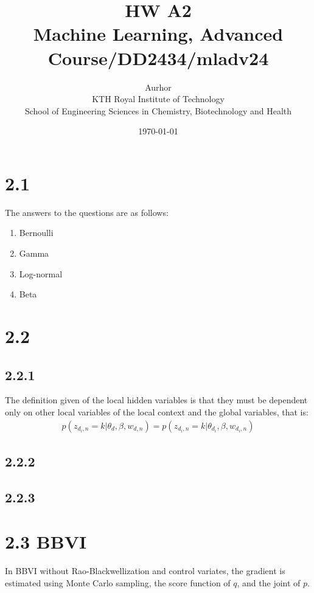 \documentclass{article}
\title{HW A2\\\Large{Machine Learning, Advanced Course/DD2434/mladv24}}
\author{Aurhor \\ KTH Royal Institute of Technology\\ School of Engineering Sciences in Chemistry, Biotechnology and Health}
\date{\today}
\begin{document}
\maketitle

\fancyfoot[C]{\thepage}
\begin{multicols}{2}

    \section*{2.1}
    The answers to the questions are as follows:
    \begin{enumerate}[noitemsep, topsep=0pt]
        \item Bernoulli
        \item Gamma
        \item Log-normal
        \item Beta
    \end{enumerate}
    \section*{2.2}
    \subsection*{2.2.1} 
    The definition given of the local hidden variables is that they must be dependent
    only on other local variables of the local context and the global variables, that is:
    \begin{align}
        p(z_{d_i,n} = k |\theta_d, \beta, w_{d,n}) = p(z_{d_i,n} = k | \theta_{d_i}, \beta, w_{d_i,n})
    \end{align}
    \subsection*{2.2.2}

    \subsection*{2.2.3}
    


\section*{2.3 BBVI}
In BBVI without Rao-Blackwellization and control variates, the gradient is estimated using Monte Carlo sampling, the score function of \(q\), and the joint of \(p\).



\end{multicols}
\end{document}
